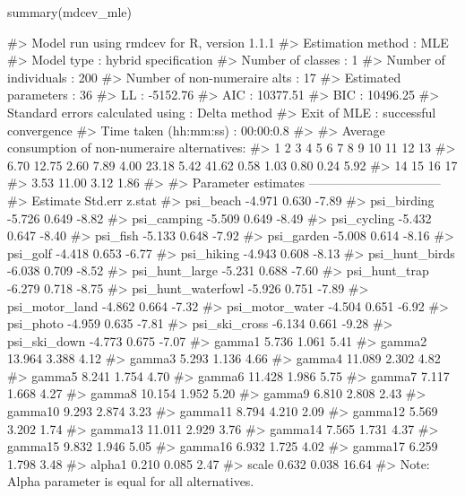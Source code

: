 \begin{Schunk}
\begin{Sinput}
summary(mdcev_mle)
\end{Sinput}
\begin{Soutput}
#> Model run using rmdcev for R, version 1.1.1 
#> Estimation method                : MLE
#> Model type                       : hybrid specification
#> Number of classes                : 1
#> Number of individuals            : 200
#> Number of non-numeraire alts     : 17
#> Estimated parameters             : 36
#> LL                               : -5152.76
#> AIC                              : 10377.51
#> BIC                              : 10496.25
#> Standard errors calculated using : Delta method
#> Exit of MLE                      : successful convergence
#> Time taken (hh:mm:ss)            : 00:00:0.8
#> 
#> Average consumption of non-numeraire alternatives:
#>     1     2     3     4     5     6     7     8     9    10    11    12    13 
#>  6.70 12.75  2.60  7.89  4.00 23.18  5.42 41.62  0.58  1.03  0.80  0.24  5.92 
#>    14    15    16    17 
#>  3.53 11.00  3.12  1.86 
#> 
#> Parameter estimates --------------------------------  
#>                    Estimate Std.err z.stat
#> psi_beach            -4.971   0.630  -7.89
#> psi_birding          -5.726   0.649  -8.82
#> psi_camping          -5.509   0.649  -8.49
#> psi_cycling          -5.432   0.647  -8.40
#> psi_fish             -5.133   0.648  -7.92
#> psi_garden           -5.008   0.614  -8.16
#> psi_golf             -4.418   0.653  -6.77
#> psi_hiking           -4.943   0.608  -8.13
#> psi_hunt_birds       -6.038   0.709  -8.52
#> psi_hunt_large       -5.231   0.688  -7.60
#> psi_hunt_trap        -6.279   0.718  -8.75
#> psi_hunt_waterfowl   -5.926   0.751  -7.89
#> psi_motor_land       -4.862   0.664  -7.32
#> psi_motor_water      -4.504   0.651  -6.92
#> psi_photo            -4.959   0.635  -7.81
#> psi_ski_cross        -6.134   0.661  -9.28
#> psi_ski_down         -4.773   0.675  -7.07
#> gamma1                5.736   1.061   5.41
#> gamma2               13.964   3.388   4.12
#> gamma3                5.293   1.136   4.66
#> gamma4               11.089   2.302   4.82
#> gamma5                8.241   1.754   4.70
#> gamma6               11.428   1.986   5.75
#> gamma7                7.117   1.668   4.27
#> gamma8               10.154   1.952   5.20
#> gamma9                6.810   2.808   2.43
#> gamma10               9.293   2.874   3.23
#> gamma11               8.794   4.210   2.09
#> gamma12               5.569   3.202   1.74
#> gamma13              11.011   2.929   3.76
#> gamma14               7.565   1.731   4.37
#> gamma15               9.832   1.946   5.05
#> gamma16               6.932   1.725   4.02
#> gamma17               6.259   1.798   3.48
#> alpha1                0.210   0.085   2.47
#> scale                 0.632   0.038  16.64
#> Note: Alpha parameter is equal for all alternatives.
\end{Soutput}
\end{Schunk}

